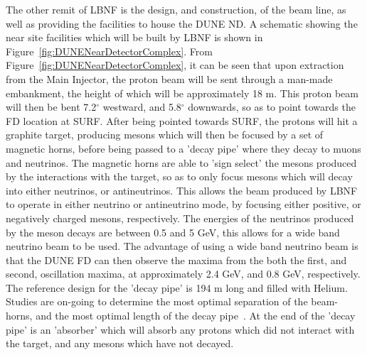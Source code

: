 The other remit of LBNF is the design, and construction, of the beam line, as well as providing the facilities to house the DUNE ND. A schematic showing the near site facilities which will be built by LBNF is shown in Figure~\ref{fig:DUNENearDetectorComplex}. From Figure~\ref{fig:DUNENearDetectorComplex}, it can be seen that upon extraction from the Main Injector, the proton beam will be sent through a man-made embankment, the height of which will be approximately 18 m. This proton beam will then be bent 7.2$^{\circ}$ westward, and 5.8$^{\circ}$ downwards, so as to point towards the FD location at SURF. After being pointed towards SURF, the protons will hit a graphite target, producing mesons which will then be focused by a set of magnetic horns, before being passed to a 'decay pipe' where they decay to muons and neutrinos. The magnetic horns are able to 'sign select' the mesons produced by the interactions with the target, so as to only focus mesons which will decay into either neutrinos, or antineutrinos. This allows the beam produced by LBNF to operate in either neutrino or antineutrino mode, by focusing either positive, or negatively charged mesons, respectively. The energies of the neutrinos produced by the meson decays are between 0.5 and 5 GeV, this allows for a wide band neutrino beam to be used. The advantage of using a wide band neutrino beam is that the DUNE FD can then observe the maxima from the both the first, and second, oscillation maxima, at approximately 2.4 GeV, and 0.8 GeV, respectively. The reference design for the 'decay pipe' is 194 m long and filled with Helium. Studies are on-going to determine the most optimal separation of the beam-horns, and the most optimal length of the decay pipe~\citep{DUNECDR_V2, DUNECDR_V3}. At the end of the 'decay pipe' is an 'absorber' which will absorb any protons which did not interact with the target, and any mesons which have not decayed. \\

